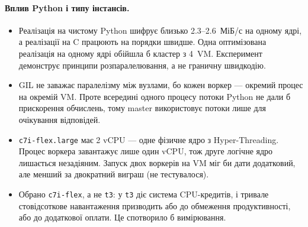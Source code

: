 \documentclass[a4paper,12pt]{article}
\begin{document}
\paragraph{Вплив Python і типу інстансів.}
\begin{itemize}
  \item Реалізація на чистому Python шифрує близько 2.3--2.6~МіБ/с на одному ядрі, а
        реалізації на C працюють на порядки швидше. Одна оптимізована реалізація на
        одному ядрі обійшла б кластер з 4~VM. Експеримент демонструє принципи
        розпаралелювання, а не граничну швидкодію.
  \item GIL не заважає паралелізму між вузлами, бо кожен воркер --- окремий процес на
        окремій VM. Проте всередині одного процесу потоки Python не дали б прискорення
        обчислень, тому master використовує потоки лише для очікування відповідей.
  \item \texttt{c7i-flex.large} має 2 vCPU --- одне фізичне ядро з Hyper-Threading.
        Процес воркера завантажує лише один vCPU, тож друге логічне ядро лишається
        незадіяним. Запуск двох воркерів на VM міг би дати додатковий, але менший за
        двократний виграш (не тестувалося).
  \item Обрано \texttt{c7i-flex}, а не \texttt{t3}: у \texttt{t3} діє система
        CPU-кредитів, і тривале стовідсоткове навантаження призводить або до
        обмеження продуктивності, або до додаткової оплати. Це спотворило б вимірювання.
\end{itemize}
\end{document}
